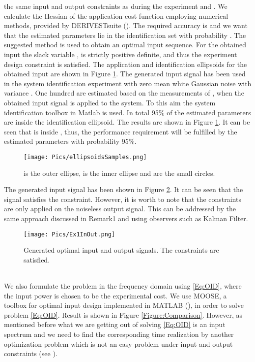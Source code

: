 \documentclass{ifacconf}
\begin{document}
the same input and output constraints as during the experiment and . We calculate the Hessian of the application cost function employing numerical methods, provided by DERIVESTsuite (\cite{DErrico2007}). The required accuracy is  and we want that the estimated parameters lie in the identification set with probability . The suggested method is used to obtain an optimal input sequence.  For the obtained input the slack variable , is strictly positive definite, and thus the experiment design constraint is satisfied. The application and identification ellipsoids for the obtained input are shown in Figure \ref{Figure:EstimatedSamples}.
The generated input signal has been used in the system identification experiment with zero mean white Gaussian noise  with variance . One hundred  are estimated based on the measurements of , when the obtained input signal is applied to the system. To this aim the system identification toolbox in Matlab is used. In total 95\% of the estimated parameters are inside the identification ellipsoid. The results are shown in Figure \ref{Figure:EstimatedSamples}. It can be seen that  is inside , thus, the performance requirement will be fulfilled by the estimated parameters with probability 95\%.
\vspace{-0.1cm}
\begin{figure}[ht]
      \centering
     \texttt{[image: Pics/ellipsoidsSamples.png]}
      \caption{ is the outer ellipse,  is the inner ellipse and  are the small circles.}
      \label{Figure:EstimatedSamples}
\end{figure}
The generated input signal has been shown in Figure \ref{Figure:OptimalInput}. It can be seen that the signal satisfies the constraint. However, it is worth to note that the constraints are only applied on the noiseless output signal. This can be addressed by the same approach discussed in Remark1 and using observers such as Kalman Filter.
\vspace{-0.1cm}
\begin{figure}[htpb]
      \centering
     \texttt{[image: Pics/Ex1InOut.png]}
      \caption{Generated optimal input and output signals. The constraints are satisfied.}
      \label{Figure:OptimalInput}
\end{figure}
\\
We also formulate the problem in the frequency domain using \eqref{Eq:OID}, where the input power is chosen to be the experimental cost. We use MOOSE, a toolbox for optimal input design implemented in MATLAB (\cite{moose}), in order to solve problem \eqref{Eq:OID}. Result is shown in Figure \ref{Figure:Comparison}. However, as mentioned before what we are getting out of solving \eqref{Eq:OID} is an input spectrum and we need to find the corresponding time realization by another optimization problem which is not an easy problem under input and output constraints (see  \cite{LarssonPer2013}).
\end{document}
